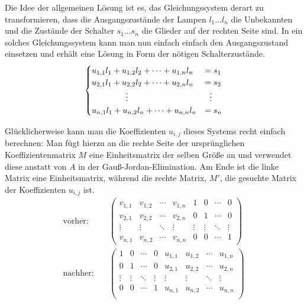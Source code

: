 \documentclass{scrartcl}
\begin{document}
Die Idee der allgemeinen Lösung ist es, das Gleichungssystem derart zu
transformieren, dass die Ausgangszustände der Lampen $l_1\dots l_n$ die
Unbekannten und die Zustände der Schalter $s_1\dots s_n$ die Glieder auf der
rechten Seite sind. In ein solches Gleichungssystem kann man nun einfach einfach
den Ausgangszustand einsetzen und erhält eine Lösung in Form der nötigen
Schalterzustände.
\begin{equation}\label{transposedSys}
\begin{cases}
  u_{1,1}l_1+u_{1,2}l_2+\dots+u_{1,n}l_n&=s_1\\
  u_{2,1}l_1+u_{2,2}l_2+\dots+u_{2,n}l_n&=s_2\\
  \hfil\vdots\hfil&\hfil\vdots\hfil\\
  u_{n,1}l_1+u_{n,2}l_n+\dots+u_{n,n}l_n&=s_n\\
\end{cases}
\end{equation}

Glücklicherweise kann man die Koeffizienten $u_{i,j}$ dieses Systems recht
einfach berechnen: Man fügt hierzu an die rechte Seite der ursprünglichen
Koeffizientenmatrix $M$ eine Einheitsmatrix der selben Größe an und verwendet
diese anstatt von $A$ in der Gauß-Jordan-Elimination. Am Ende ist die
linke Matrix eine Einheitsmatrix, während die rechte Matrix, $M'$, die gesuchte
Matrix der Koeffizienten $u_{i,j}$ ist.
\begin{align}
\text{vorher:}\quad&
\left(\begin{array}{cccc|cccc}
  v_{1,1}&v_{1,2}&\cdots&v_{1,n}&1&0&\cdots&0\\
  v_{2,1}&v_{2,2}&\cdots&v_{2,n}&0&1&\cdots&0\\
  \vdots&\vdots&\ddots&\vdots&\vdots&\vdots&\ddots&\vdots\\
  v_{n,1}&v_{n,2}&\cdots&v_{n,n}&0&0&\cdots&1
\end{array}\right)\\
\text{nachher:}\quad&
\left(\begin{array}{cccc|cccc}
  1&0&\cdots&0&u_{1,1}&u_{1,2}&\cdots&u_{1,n}\\
  0&1&\cdots&0&u_{2,1}&u_{2,2}&\cdots&u_{2,n}\\
  \vdots&\vdots&\ddots&\vdots&\vdots&\vdots&\ddots&\vdots\\
  0&0&\cdots&1&u_{n,1}&u_{n,2}&\cdots&u_{n,n}\\
\end{array}\right)
\end{align}
\end{document}
